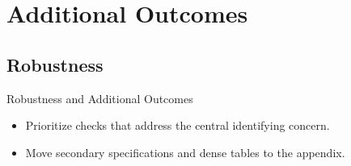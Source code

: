 \section{Additional Outcomes}
\subsection{Robustness}

\begin{frame}{Robustness and Additional Outcomes}
  \begin{itemize}
    \item Prioritize checks that address the central identifying concern.
    \item Move secondary specifications and dense tables to the appendix.
  \end{itemize}
\end{frame}
